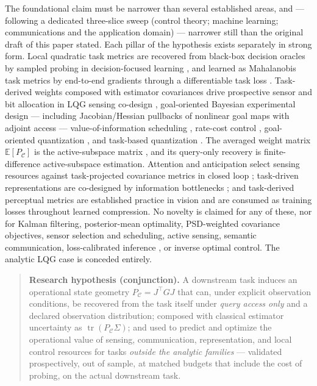 \documentclass[letterpaper,onecolumn]{IEEEtran}
\theoremstyle{definition}
\theoremstyle{remark}
\newcommand{\E}{\mathbb{E}}
\newcommand{\PC}{P_{\mathcal{C}}}
\newcommand{\tr}{\operatorname{tr}}
\newcommand{\Sig}{\Sigma}
\begin{document}
The foundational claim must be narrower than several established areas, and
--- following a dedicated three-slice sweep (control theory; machine
learning; communications and the application domain) --- narrower still than
the original draft of this paper stated. Each pillar of the hypothesis exists
separately in strong form. Local quadratic task metrics are recovered from
black-box decision oracles by sampled probing in decision-focused learning
\cite{shah2022,shah2024}, and learned as Mahalanobis task metrics by
end-to-end gradients through a differentiable task loss \cite{bansal2023}.
Task-derived weights composed with
estimator covariances drive prospective sensor and bit allocation in LQG
sensing co-design \cite{tzoumas2021}, goal-oriented Bayesian experimental
design \cite{attia2018,wu2023,quadgoed2025} --- including Jacobian/Hessian
pullbacks of nonlinear goal maps with adjoint access --- value-of-information
scheduling \cite{soleymani2022,soleymani2023,soleymani2024}, rate-cost
control \cite{kostina2019,tanaka2015}, goal-oriented quantization
\cite{zou2022}, and task-based quantization \cite{shlezinger2019}. The
averaged weight matrix $\E[\PC]$ is the active-subspace matrix
\cite{cdw2014,constantine2015}, and its query-only recovery is
finite-difference active-subspace estimation. Attention
and anticipation select sensing resources against task-projected covariance
metrics in closed loop \cite{carlone2018}; task-driven representations are
co-designed by information bottlenecks \cite{pacelli2019}; and
task-derived perceptual metrics are established practice in vision
\cite{zhang2018} and are consumed as training losses throughout learned
compression. No novelty is claimed for any of these, nor for Kalman
filtering, posterior-mean optimality, PSD-weighted covariance objectives,
sensor selection and scheduling, active sensing, semantic communication,
loss-calibrated inference \cite{lacostejulien2011}, or inverse optimal
control. The analytic LQG case is conceded entirely.

\begin{quote}
\textbf{Research hypothesis (conjunction).} A downstream task induces an
operational state geometry $\PC=J^{\top}GJ$ that can, under explicit
observation conditions, be recovered from the task itself under
\emph{query access only} and a declared observation distribution; composed
with classical estimator uncertainty as $\tr(\PC\Sig)$; and used to predict
and optimize the operational value of sensing, communication,
representation, and local control resources for tasks \emph{outside the
analytic families} --- validated prospectively, out of sample, at matched
budgets that include the cost of probing, on the actual downstream task.
\end{quote}
\end{document}
